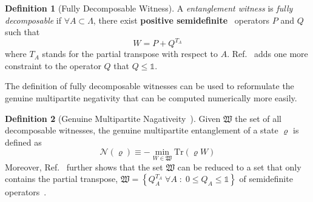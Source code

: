 \documentclass[12font]{article}
\theoremstyle{definition}
\newtheorem{definition}{Definition}[section]
\newcommand{\lr}[1]{\left(  #1  \right)}
\newcommand{\lrg}[1]{\left\{  #1  \right\}}
\newcommand{\mrm}[1]{\mathrm{#1}}
\newcommand{\Tr}{\mrm{Tr}}
\begin{document}
\begin{definition}[Fully Decomposable Witness]
    A \textit{entanglement witness} is \textit{fully decomposable} if $\forall A \subset \Lambda$, there exist \textbf{positive semidefinite}~\cite{Lewenstein-Kraus-Cirac-Horodecki_2000} operators $P$ and $Q$ such that 
    \[
    W = P + Q^{T_A}
    \]
    where $T_A$ stands for the partial transpose with respect to $A$. Ref.~\cite{Lyu-Chandorkar-Kapoor-Takei-Sorensen-Witczak-Krempa_2026} adds one more constraint to the operator $Q$ that $Q \leq \mathds{1}$.
\end{definition}
The definition of fully decomposable witnesses can be used to reformulate the genuine multipartite negativity that can be computed numerically more easily.   
\begin{definition}[Genuine Multipartite Nagativeity~\cite{Jungnitsch-Moroder-Guhne_2011, Hofmann-Moroder-Guhne_2014}]\label{def:GMN_2}
    Given $\mathfrak{W}$ the set of all decomposable witnesses, the genuine multipartite entanglement of a state $\varrho$ is defined as
    \[
    \mathcal{N}(\varrho) \equiv -\min_{W \in \mathfrak{W}}\Tr\lr{\varrho W}
    \]
    Moreover, Ref.~\cite{Lyu-Chandorkar-Kapoor-Takei-Sorensen-Witczak-Krempa_2026} further shows that the set $\mathfrak{W}$ can be reduced to a set that only contains the partial transpose, $\mathfrak{W} = \lrg{Q_A^{T_A} \; \forall A\;:\; 0 \leq Q_A \leq \mathds{1}}$ of semidefinite operators~\cite{Lewenstein-Kraus-Cirac-Horodecki_2000}.
\end{definition}
\end{document}
